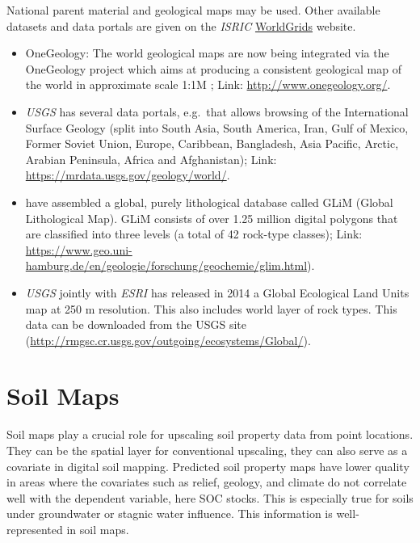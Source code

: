 \documentclass[10pt,b5paper,]{book}
\theoremstyle{definition}
\theoremstyle{definition}
\theoremstyle{definition}
\theoremstyle{remark}
\begin{document}
National parent material and geological maps may be used. Other
available datasets and data portals are given on the \emph{ISRIC}
\href{http://worldgrids.org/doku.php}{WorldGrids} website.

\begin{itemize}
\item
  OneGeology: The world geological maps are now being integrated via the
  OneGeology project which aims at producing a consistent geological map
  of the world in approximate scale 1:1M \citep{jackson2007onegeology};
  Link: \url{http://www.onegeology.org/}.
\item
  \emph{USGS} has several data portals, e.g.~that allows browsing of the
  International Surface Geology (split into South Asia, South America,
  Iran, Gulf of Mexico, Former Soviet Union, Europe, Caribbean,
  Bangladesh, Asia Pacific, Arctic, Arabian Peninsula, Africa and
  Afghanistan); Link: \url{https://mrdata.usgs.gov/geology/world/}.
\item
  \citet{hartmann2012new} have assembled a global, purely lithological
  database called GLiM (Global Lithological Map). GLiM consists of over
  1.25 million digital polygons that are classified into three levels (a
  total of 42 rock-type classes); Link:
  \url{https://www.geo.uni-hamburg.de/en/geologie/forschung/geochemie/glim.html}).
\item
  \emph{USGS} jointly with \emph{ESRI} has released in 2014 a Global
  Ecological Land Units map at 250 m resolution. This also includes
  world layer of rock types. This data can be downloaded from the USGS
  site (\url{http://rmgsc.cr.usgs.gov/outgoing/ecosystems/Global/}).
\end{itemize}

\hypertarget{soil-maps}{%
\section{Soil Maps}\label{soil-maps}}

Soil maps play a crucial role for upscaling soil property data from
point locations. They can be the spatial layer for conventional
upscaling, they can also serve as a covariate in digital soil mapping.
Predicted soil property maps have lower quality in areas where the
covariates such as relief, geology, and climate do not correlate well
with the dependent variable, here SOC stocks. This is especially true
for soils under groundwater or stagnic water influence. This information
is well-represented in soil maps.
\end{document}
